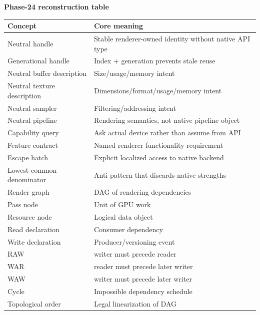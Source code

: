 \textbf{Phase-24 reconstruction table}

{\def\LTcaptype{none} %
\begin{longtable}[]{@{}
  >{\raggedright\arraybackslash}p{}
  >{\raggedright\arraybackslash}p{}@{}}
\toprule\noalign{}
\begin{minipage}[b]{\linewidth}\raggedright
Concept
\end{minipage} & \begin{minipage}[b]{\linewidth}\raggedright
Core meaning
\end{minipage} \\
\midrule\noalign{}
\endhead
\bottomrule\noalign{}
\endlastfoot
Neutral handle & Stable renderer-owned identity without native API type \\
Generational handle & Index + generation prevents stale reuse \\
Neutral buffer description & Size/usage/memory intent \\
Neutral texture description & Dimensions/format/usage/memory intent \\
Neutral sampler & Filtering/addressing intent \\
Neutral pipeline & Rendering semantics, not native pipeline object \\
Capability query & Ask actual device rather than assume from API \\
Feature contract & Named renderer functionality requirement \\
Escape hatch & Explicit localized access to native backend \\
Lowest-common denominator & Anti-pattern that discards native strengths \\
Render graph & DAG of rendering dependencies \\
Pass node & Unit of GPU work \\
Resource node & Logical data object \\
Read declaration & Consumer dependency \\
Write declaration & Producer/versioning event \\
RAW & writer must precede reader \\
WAR & reader must precede later writer \\
WAW & writer must precede later writer \\
Cycle & Impossible dependency schedule \\
Topological order & Legal linearization of DAG \\

\end{longtable}}
